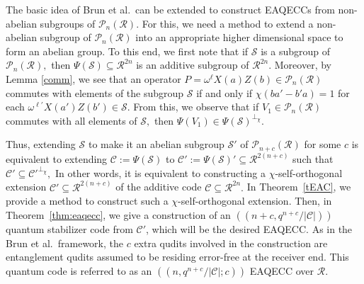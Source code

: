 \documentclass{article}
\theoremstyle{remark}
\theoremstyle{definition}
\numberwithin{equation}{section}
\begin{document}
The basic idea of Brun et al.\ can be extended to construct EAQECCs from non-abelian subgroups of $\mathcal{P}_n(\mathcal{R}).$ For this, we need a method to extend a non-abelian subgroup of $\mathcal{P}_n(\mathcal{R})$ into an appropriate higher dimensional space to form an abelian group.  To this end, we first note that if $\mathcal{S}$ is a subgroup of $\mathcal{P}_n(\mathcal{R}),$ then $\Psi(\mathcal{S}) \subseteq \mathcal{R}^{2n}$ is an additive subgroup of $\mathcal{R}^{2n}.$ Moreover, by Lemma \ref{comm}, we see that an operator $P=\omega^\ell X(a)Z(b) \in \mathcal{P}_n(\mathcal{R})$ commutes with elements of the subgroup $\mathcal{S}$ if and only if $\chi(ba'-b'a)=1$ for each $\omega^{\ell'}X(a')Z(b')\in \mathcal{S}.$ From this, we observe that if $V_1 \in \mathcal{P}_n(\mathcal{R})$ commutes with all elements of $\mathcal{S},$ then $\Psi(V_1) \in \Psi (\mathcal{S})^{\perp_\chi}.$ 

Thus, extending $\mathcal{S}$ to make it an abelian subgroup $\mathcal{S}'$ of $\mathcal{P}_{n+c}(\mathcal{R})$ for some $c$ is equivalent to extending $\mathcal{C} := \Psi(\mathcal{S})$ to $\mathcal{C}' := \Psi(\mathcal{S})' \subseteq  \mathcal{R}^{2(n+c)}$ such that $\mathcal{C}' \subseteq \mathcal{C}'^{\perp_\chi},$ In other words, it is equivalent to constructing a $\chi$-self-orthogonal extension $\mathcal{C}' \subseteq  \mathcal{R}^{2(n+c)}$ of the additive code $\mathcal{C} \subseteq \mathcal{R}^{2n}.$ In Theorem~\ref{tEAC}, we provide a method to construct such a $\chi$-self-orthogonal extension. Then, in Theorem~\ref{thm:eaqecc}, we give a construction of an $((n+c,q^{n+c}/|\mathcal{C}|))$ quantum stabilizer code from $\mathcal{C}'$, which will be the desired EAQECC. As in the Brun et al.\ framework, the $c$ extra qudits involved in the construction are entanglement qudits assumed to be residing error-free at the receiver end. This quantum code is referred to as an $((n,q^{n+c}/|\mathcal{C}|;c))$ EAQECC over $\mathcal{R}$.
\end{document}
